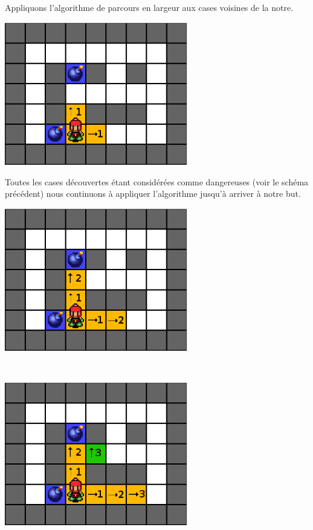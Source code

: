 			Appliquons l'algorithme de parcours en largeur aux cases voisines de la notre.
			
			
			\begin{center}
				\includegraphics[width=8cm]{./Analyse/Img/largeur_2.eps}
			\end{center}
			
			
			Toutes les cases découvertes étant considérées comme dangereuses (voir le schéma précédent) nous continuons à appliquer l'\gls{algorithme} jusqu'à arriver à notre but.
			
			\begin{center}
				\includegraphics[width=8cm]{./Analyse/Img/largeur_3.eps}
				
				$\,$
				
				\includegraphics[width=8cm]{./Analyse/Img/largeur_4.eps}
			\end{center}
			
